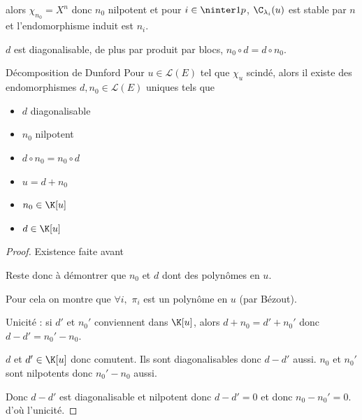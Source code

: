 alors $\chi_{n_0} = X^n$ donc $n_0$ nilpotent et pour $i \in \ninter 1 p$, 
$\C_{\lambda_i}(u)$ est stable par $n$ et l'endomorphisme induit est 
$n_i$. 

$d$ est diagonalisable, de plus par produit par blocs, 
$n_0 \circ d = d \circ n_0$. 



\begin{theoreme}{Décomposition de Dunford}{}
    Pour $u \in \mathscr L(E)$ tel que $\chi_u$ scindé, alors il existe des endomorphismes 
    $d, n_0 \in \mathscr L(E)$ uniques tels que 
    \begin{itemize}
        \item $d$ diagonalisable
        \item $n_0$ nilpotent
        \item $d \circ n_0 = n_0 \circ d$
        \item $u = d + n_0$
        \item $n_0 \in \K[u]$
        \item $d \in \K[u]$
    \end{itemize}
\end{theoreme}

\begin{proof}
    Existence faite avant 

    Reste donc à démontrer que $n_0$ et $d$ dont des polynômes en $u$.

    Pour cela on montre que $\forall i, $ $\pi_i$ est un polynôme en $u$ 
    (par Bézout). 

    \avspace Unicité : si $d'$ et $n_0'$ conviennent dans $\K[u]$, alors 
    $d + n_0 = d' + n_0'$ donc $d - d' = n_0' - n_0$.

    $d$ et $d' \in \K[u]$ donc comutent. Ils sont diagonalisables donc $d - d'$ aussi.
    $n_0$ et $n_0'$ sont nilpotents donc $n_0' - n_0$ aussi.

    Donc $d - d'$ est diagonalisable et nilpotent donc $d - d' = 0$ et donc $n_0 - n_0' = 0$.
    d'où l'unicité.
\end{proof}

